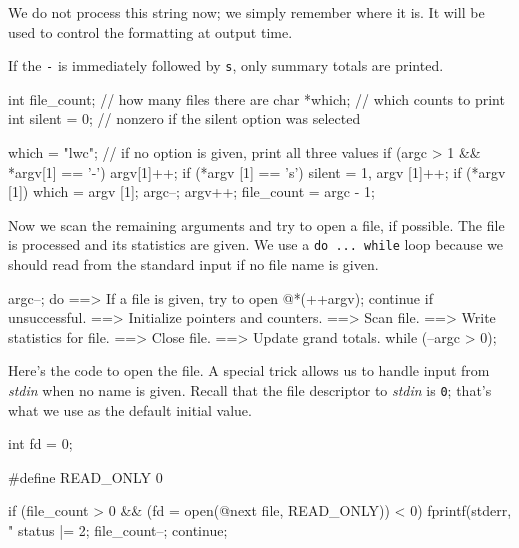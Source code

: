 \documentclass[11pt,a4paper]{article}
\begin{document}
We do not process this string now; we simply remember where it is. It will be used to control the
formatting at output time.

If the \texttt{-} is immediately followed by \texttt{s}, only summary totals are printed.

\begin{code}[name={Variables local to main}]
int file_count;  // how many files there are
char *which;     // which counts to print
int silent = 0;  // nonzero if the silent option was selected
\end{code}

\begin{code}[name={Set up option selection}]
which = "lwc";   // if no option is given, print all three values
if (argc > 1 && *argv[1] == '-') {
    argv[1]++;
    if (*argv [1] == 's') silent = 1, argv [1]++;
    if (*argv [1]) which = argv [1];
    argc--;
    argv++;
}
file_count = argc - 1;
\end{code}

Now we scan the remaining arguments and try to open a file, if possible. The file is processed and
its statistics are given. We use a \texttt{do ... while} loop because we should read from the
standard input if no file name is given.

\begin{code}[name={Process all the files}]
argc--;
do {
    ==> If a file is given, try to open @{*(++argv)}; continue if unsuccessful.
    ==> Initialize pointers and counters.
    ==> Scan file.
    ==> Write statistics for file.
    ==> Close file.
    ==> Update grand totals.
} while (--argc > 0);
\end{code}

Here's the code to open the file. A special trick allows us to handle input from \emph{stdin} when
no name is given. Recall that the file descriptor to \emph{stdin} is \texttt{0}; that's what we use
as the default initial value.

\begin{code}[name={Variables local to main}]
int fd = 0;
\end{code}

\begin{code}[name={Preprocessor definitions}]
#define READ_ONLY 0
\end{code}

\begin{code}[name={If a file is given, try to open @{next file}; continue if unsuccessful}]
if (file_count > 0 && (fd = open(@{next file}, READ_ONLY)) < 0) {
    fprintf(stderr, "%
    status |= 2;
    file_count--;
    continue;
}
\end{code}
\end{document}
